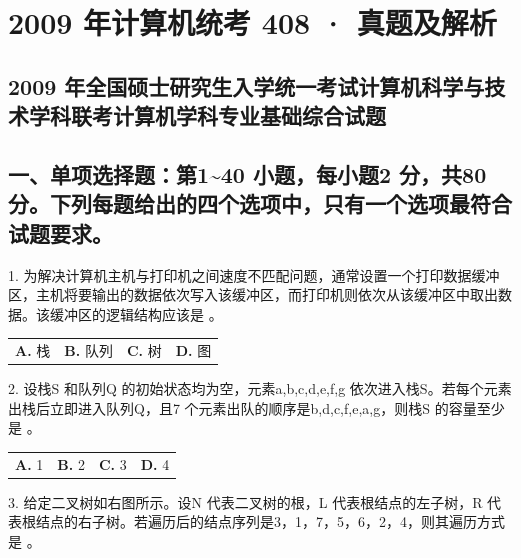 \documentclass[UTF8,11pt]{ctexart}
\begin{document}
\section*{2009 年计算机统考 408 · 真题及解析}
\subsection*{2009 年全国硕士研究生入学统一考试计算机科学与技术学科联考计算机学科专业基础综合试题}

\subsection*{一、单项选择题：第1\textasciitilde{}40 小题，每小题2 分，共80 分。下列每题给出的四个选项中，只有一个选项最符合试题要求。}

1. 为解决计算机主机与打印机之间速度不匹配问题，通常设置一个打印数据缓冲区，主机将要输出的数据依次写入该缓冲区，而打印机则依次从该缓冲区中取出数据。该缓冲区的逻辑结构应该是 。


\begin{center}\begin{tabular}{>{\raggedright\arraybackslash}p{\dimexpr(\linewidth-8\tabcolsep)/4\relax}>{\raggedright\arraybackslash}p{\dimexpr(\linewidth-8\tabcolsep)/4\relax}>{\raggedright\arraybackslash}p{\dimexpr(\linewidth-8\tabcolsep)/4\relax}>{\raggedright\arraybackslash}p{\dimexpr(\linewidth-8\tabcolsep)/4\relax}}
\textbf{A.} 栈 & \textbf{B.} 队列 & \textbf{C.} 树 & \textbf{D.} 图\\[.35em]\end{tabular}\end{center}

2. 设栈S 和队列Q 的初始状态均为空，元素a,b,c,d,e,f,g 依次进入栈S。若每个元素出栈后立即进入队列Q，且7 个元素出队的顺序是b,d,c,f,e,a,g，则栈S 的容量至少是 。


\begin{center}\begin{tabular}{>{\raggedright\arraybackslash}p{\dimexpr(\linewidth-8\tabcolsep)/4\relax}>{\raggedright\arraybackslash}p{\dimexpr(\linewidth-8\tabcolsep)/4\relax}>{\raggedright\arraybackslash}p{\dimexpr(\linewidth-8\tabcolsep)/4\relax}>{\raggedright\arraybackslash}p{\dimexpr(\linewidth-8\tabcolsep)/4\relax}}
\textbf{A.} 1 & \textbf{B.} 2 & \textbf{C.} 3 & \textbf{D.} 4\\[.35em]\end{tabular}\end{center}

3. 给定二叉树如右图所示。设N 代表二叉树的根，L 代表根结点的左子树，R 代表根结点的右子树。若遍历后的结点序列是3，1，7，5，6，2，4，则其遍历方式是 。
\end{document}
